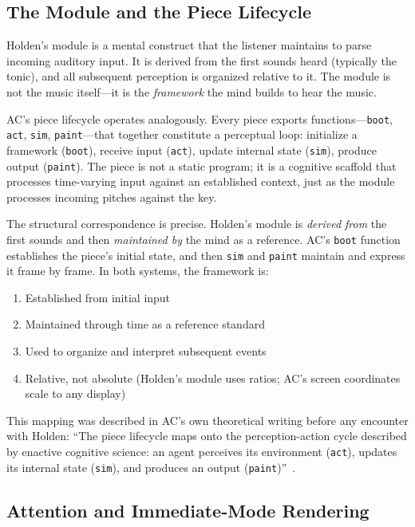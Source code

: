 \documentclass[10pt,letterpaper,twocolumn]{article}
\begin{document}
\subsection{The Module and the Piece Lifecycle}

Holden's module is a mental construct that the listener maintains to parse incoming auditory input. It is derived from the first sounds heard (typically the tonic), and all subsequent perception is organized relative to it. The module is not the music itself---it is the \emph{framework} the mind builds to hear the music.

AC's piece lifecycle operates analogously. Every piece exports functions---\texttt{boot}, \texttt{act}, \texttt{sim}, \texttt{paint}---that together constitute a perceptual loop: initialize a framework (\texttt{boot}), receive input (\texttt{act}), update internal state (\texttt{sim}), produce output (\texttt{paint}). The piece is not a static program; it is a cognitive scaffold that processes time-varying input against an established context, just as the module processes incoming pitches against the key.

The structural correspondence is precise. Holden's module is \emph{derived from} the first sounds and then \emph{maintained by} the mind as a reference. AC's \texttt{boot} function establishes the piece's initial state, and then \texttt{sim} and \texttt{paint} maintain and express it frame by frame. In both systems, the framework is:

\begin{enumerate}
\item Established from initial input
\item Maintained through time as a reference standard
\item Used to organize and interpret subsequent events
\item Relative, not absolute (Holden's module uses ratios; AC's screen coordinates scale to any display)
\end{enumerate}

This mapping was described in AC's own theoretical writing before any encounter with Holden: ``The piece lifecycle maps onto the perception-action cycle described by enactive cognitive science: an agent perceives its environment (\texttt{act}), updates its internal state (\texttt{sim}), and produces an output (\texttt{paint})''~\citep{acpieces2026}.

\subsection{Attention and Immediate-Mode Rendering}
\end{document}
